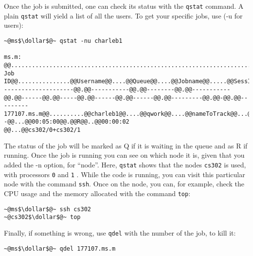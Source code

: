 \documentclass[10pt,letter]{article}
\newcommand{\dollar}{\mbox{\textdollar}}
\begin{document}
Once the job is submitted, one can check its status with the \texttt{qstat} command. 
A plain \texttt{qstat}  will yield a list of all the users. 
To get your specific jobs, use (-u for users):
\begin{bashInput}
\obeyspaces
\begin{lstlisting}[style=BashOutputStyle]
~@ms$\dollar$@~ qstat -nu charleb1

ms.m: 
@@...........................................................................@@Req'd@@...@@Req'd@@.......@@Elap
Job ID@@...............@@Username@@....@@Queue@@....@@Jobname@@.....@@SessID@@..@@NDS@@...@@TSK@@...@@Memory@@...@@Time@@....@@S@@...@@Time
--------------------@@.@@-----------@@.@@--------@@.@@-----------@@.@@------@@.@@-----@@.@@------@@.@@------@@.@@---------@@.@@-@@.@@---------
177107.ms.m@@..........@@charleb1@@....@@qwork@@....@@nameToTrack@@...@@4059@@.....@@1@@......@@2@@....@@--@@...@@00:05:00@@.@@R@@..@@00:00:02
@@...@@cs302/0+cs302/1
\end{lstlisting}
\end{bashInput}



The status of the job will be marked as Q if it is waiting in the queue and as R if running. 
Once the job is running you can see on which node it is, given that you added the -n option, for ``node''. 
Here, \texttt{qstat}  shows that the nodes \texttt{cs302} is used, with processors \texttt{0}  and \texttt{1} .
While the code is running, you can visit this particular node with the command \texttt{ssh}. 
Once on the node, you can, for example, check the CPU usage and the memory allocated with the command \texttt{top}: 

\begin{bashInput}
\begin{lstlisting}[style=BashInputStyle]
~@ms$\dollar$@~ ssh cs302
~@cs302$\dollar$@~ top
\end{lstlisting}
\end{bashInput}


Finally, if something is wrong, use \texttt{qdel}  with the number of the job, to kill it:
\begin{bashInput}
\begin{lstlisting}[style=BashInputStyle]
~@ms$\dollar$@~ qdel 177107.ms.m
\end{lstlisting}
\end{bashInput}
\end{document}
